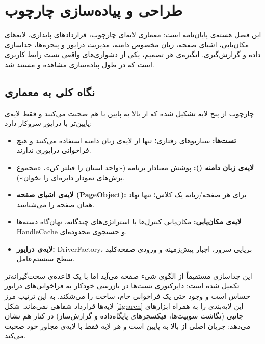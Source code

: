 \chapter{طراحی و پیاده‌سازی چارچوب}
\label{chap:framework}

این فصل هسته‌ی پایان‌نامه است: معماری لایه‌ای چارچوب، قراردادهای پایداری، لایه‌های مکان‌یابی، اشیای صفحه، زبان مخصوص دامنه، مدیریت درایور و پنجره‌ها، جداسازی داده و گزارش‌گیری. انگیزه‌ی هر تصمیم، یکی از دشواری‌های واقعی تست رابط کاربری است که در طول پیاده‌سازی مشاهده و مستند شد.

\section{نگاه کلی به معماری}
چارچوب از پنج لایه تشکیل شده که از بالا به پایین با هم صحبت می‌کنند و فقط لایه‌ی پایین‌تر با درایور سروکار دارد:
\begin{itemize}
	\item \textbf{تست‌ها:} سناریوهای رفتاری؛ تنها از لایه‌ی زبان دامنه استفاده می‌کنند و هیچ فراخوانی درایوری ندارند.
	\item \textbf{لایه‌ی زبان دامنه ():} پوشش معنادار برنامه («واحد استان را فیلتر کن»، «مجموع برش‌های نمودار دایره‌ای را بخوان»).
	\item \textbf{لایه‌ی اشیای صفحه (\gls{PageObject}):} برای هر صفحه/زبانه یک کلاس؛ تنها نهاد همان صفحه را می‌شناسد.
	\item \textbf{لایه‌ی مکان‌یابی:} مکان‌یابی کنترل‌ها با استراتژی‌های چندگانه، نهان‌گاه دسته‌ها
	\gls{HandleCache}
	و جستجوی محدوده‌ای.
	\item \textbf{لایه‌ی درایور:} \gls{DriverFactory}،
	برپایی سرور، اجبار پیش‌زمینه و ورودی صفحه‌کلید سطح سیستم‌عامل.
\end{itemize}

این جداسازی مستقیماً از الگوی شیء صفحه می‌آید
\cite{fowler2002}
اما با یک قاعده‌ی سخت‌گیرانه‌تر تکمیل شده است: دایرکتوری تست‌ها در بازرسی خودکار به فراخوانی‌های درایور حساس است و وجود حتی یک فراخوانی خام، ساخت را می‌شکند. به این ترتیب مرز لایه‌ها قرارداد شفاهی نمی‌ماند. شکل
\autoref{fig:arch}
این لایه‌بندی را به همراه ابزارهای جانبی (نگاشت سوییت‌ها، فیکسچرهای پایگاه‌داده و گزارش‌ساز) در کنار هم نشان می‌دهد: جریان اصلی از بالا به پایین است و هر لایه فقط با لایه‌ی مجاور خود صحبت می‌کند.

